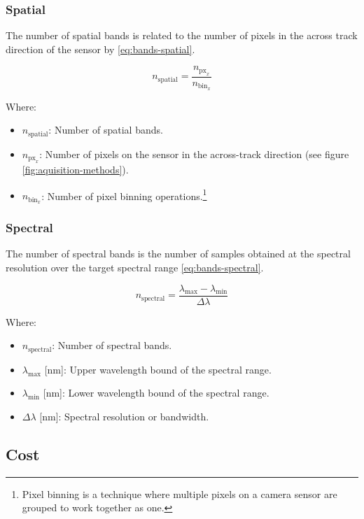 \documentclass{article}
\begin{document}
\subsubsection{Spatial}
The number of spatial bands is related to the number of pixels in the across track direction of the sensor by \eqref{eq:bands-spatial}.

\begin{equation} \label{eq:bands-spatial}
    n_{\text{spatial}} = \frac{ n_{\text{px}_x} }{ n_{\text{bin}_x}}
\end{equation}

Where:
\begin{itemize}[label={}]
    \item $n_{\text{spatial}}$: Number of spatial bands.
    \item $n_{\text{px}_x}$: Number of pixels on the sensor in the across-track direction (see figure \ref{fig:aquisition-methods}).
    \item $n_{\text{bin}_x}$: Number of pixel binning operations.\footnote{Pixel binning is a technique where multiple pixels on a camera sensor are grouped to work together as one.}
\end{itemize}


\subsubsection{Spectral}
The number of spectral bands is the number of samples obtained at the spectral resolution over the target spectral range \eqref{eq:bands-spectral}.

\begin{equation} \label{eq:bands-spectral}
    n_{\text{spectral}} = \frac{\lambda_{\text{max}} - \lambda_{\text{min}}}{\Delta\lambda} 
\end{equation}

Where:
\begin{itemize}[label={}]
    \item $n_{\text{spectral}}$: Number of spectral bands.
    \item $\lambda_{\text{max}}$ [\si{\nm}]: Upper wavelength bound of the spectral range.
    \item $\lambda_{\text{min}}$ [\si{\nm}]: Lower wavelength bound of the spectral range.
    \item $\Delta\lambda$ [\si{\nm}]: Spectral resolution or bandwidth.
\end{itemize}

\subsection{Cost}
\end{document}
